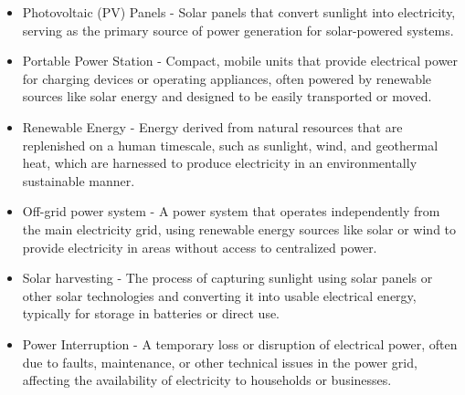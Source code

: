 {\begin{itemize}
	\item Photovoltaic (PV) Panels - Solar panels that convert sunlight into electricity, serving as the primary source of power generation for solar-powered systems.
	
	\item Portable Power Station - Compact, mobile units that provide electrical power for charging devices or operating appliances, often powered by renewable sources like solar energy and designed to be easily transported or moved.
	
	\item Renewable Energy - Energy derived from natural resources that are replenished on a human timescale, such as sunlight, wind, and geothermal heat, which are harnessed to produce electricity in an environmentally sustainable manner.
	
	\item Off-grid power system - A power system that operates independently from the main electricity grid, using renewable energy sources like solar or wind to provide electricity in areas without access to centralized power.
	
	\item Solar harvesting - The process of capturing sunlight using solar panels or other solar technologies and converting it into usable electrical energy, typically for storage in batteries or direct use.
	
	\item Power Interruption - A temporary loss or disruption of electrical power, often due to faults, maintenance, or other technical issues in the power grid, affecting the availability of electricity to households or businesses.

\end{itemize}

}
